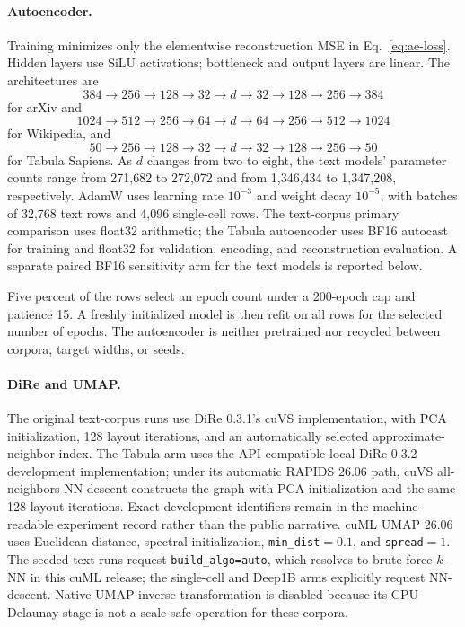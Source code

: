 \documentclass[10pt]{article}
\begin{document}
\paragraph{Autoencoder.}
Training minimizes only the elementwise reconstruction MSE in
Eq.~\eqref{eq:ae-loss}.
Hidden layers use SiLU activations; bottleneck and output layers are linear.  The
architectures are
\[
384\!\to\!256\!\to\!128\!\to\!32\!\to\!d\!\to\!32\!\to\!128\!\to\!256\!\to\!384
\]
for arXiv and
\[
1024\!\to\!512\!\to\!256\!\to\!64\!\to\!d\!\to\!64\!\to\!256\!\to\!512\!\to\!1024
\]
for Wikipedia, and
\[
50\!\to\!256\!\to\!128\!\to\!32\!\to\!d\!\to\!32\!\to\!128\!\to\!256\!\to\!50
\]
for Tabula Sapiens.  As $d$ changes from two to eight, the text models' parameter counts range from
271,682 to 272,072 and from 1,346,434 to 1,347,208, respectively.
AdamW uses learning rate $10^{-3}$ and weight decay $10^{-5}$, with batches of 32,768
text rows and 4,096 single-cell rows.  The text-corpus primary comparison uses float32
arithmetic; the Tabula autoencoder uses BF16 autocast for training and float32 for
validation, encoding, and reconstruction evaluation.  A separate paired BF16
sensitivity arm for the text models is reported below.

Five percent of the rows select an epoch count under a 200-epoch cap and patience 15.
A freshly initialized model is then refit on all rows for the selected number of epochs.
The autoencoder is neither pretrained nor recycled between corpora, target widths, or
seeds.

\paragraph{DiRe and UMAP.}
The original text-corpus runs use DiRe 0.3.1's cuVS implementation, with PCA
initialization, 128 layout iterations, and an automatically selected approximate-neighbor
index.  The Tabula arm uses the API-compatible local DiRe 0.3.2 development
implementation; under its automatic RAPIDS 26.06 path, cuVS all-neighbors NN-descent
constructs the graph with PCA initialization and the same 128 layout iterations.  Exact
development identifiers remain in the machine-readable experiment record rather than
the public narrative.  cuML UMAP 26.06 uses Euclidean distance, spectral initialization,
\texttt{min\_dist}$=0.1$, and \texttt{spread}$=1$.  The seeded text runs request
\texttt{build\_algo=auto}, which resolves to brute-force $k$-NN in this cuML release;
the single-cell and Deep1B arms explicitly request NN-descent.
Native UMAP inverse transformation is disabled because its CPU Delaunay stage is not a
scale-safe operation for these corpora.
\end{document}
